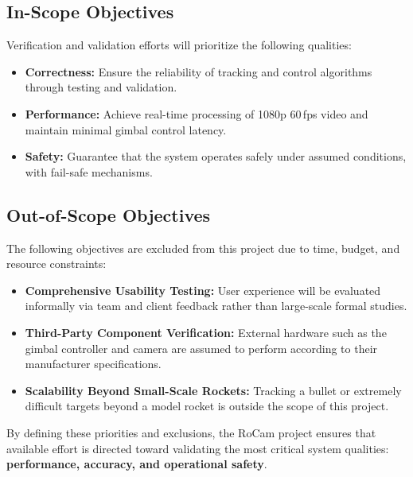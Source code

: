 \documentclass[12pt, titlepage]{article}
\begin{document}
\subsection{In-Scope Objectives}
Verification and validation efforts will prioritize the following qualities:
\begin{itemize}
  \item \textbf{Correctness:} Ensure the reliability of tracking and control
        algorithms through testing and validation.
  \item \textbf{Performance:} Achieve real-time processing of 1080p 60\,fps
        video and maintain minimal gimbal control latency.
  \item \textbf{Safety:} Guarantee that the system operates safely under
        assumed conditions, with fail-safe mechanisms.
\end{itemize}

\subsection{Out-of-Scope Objectives}
The following objectives are excluded from this project due to time, budget,
and resource constraints:
\begin{itemize}
  \item \textbf{Comprehensive Usability Testing:} User experience will be evaluated
        informally via team and client feedback rather than large-scale formal studies.
  \item \textbf{Third-Party Component Verification:} External hardware such as the
        gimbal controller and camera are assumed to perform according to their
        manufacturer specifications.
  \item \textbf{Scalability Beyond Small-Scale Rockets:} Tracking a
        bullet or extremely difficult
        targets beyond a model rocket is outside the scope of this project.
\end{itemize}

By defining these priorities and exclusions, the RoCam project ensures that
available effort is directed toward validating the most critical system
qualities: \textbf{performance, accuracy, and operational safety}.

\end{document}

